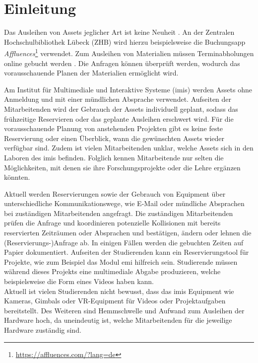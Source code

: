 
\chapter{Einleitung}
Das Ausleihen von Assets jeglicher Art ist keine Neuheit
\cite{soderholm2018borrowing}. An der Zentralen Hochschulbibliothek Lübeck (ZHB)
wird hierzu beispielsweise die Buchungsapp
\textit{Affluences}\footnote{\url{https://affluences.com/?lang=de}} verwendet.
Zum Ausleihen von Materialien müssen Terminabholungen online gebucht werden
\cite{zhb_offnung_nodate}. Die Anfragen können überprüft werden, wodurch das
vorausschauende Planen der Materialien ermöglicht wird.

Am Institut für Multimediale und Interaktive Systeme (\ac{imis}) werden Assets
ohne Anmeldung und mit einer mündlichen Absprache verwendet. Aufseiten der
Mitarbeitenden wird der Gebrauch der Assets individuell geplant, sodass das
frühzeitige Reservieren oder das geplante Ausleihen erschwert wird. Für die
vorausschauende Planung von anstehenden Projekten gibt es keine feste
Reservierung oder einen Überblick, wann die gewünschten Assets wieder verfügbar
sind. Zudem ist vielen Mitarbeitenden unklar, welche Assets sich in den Laboren
des \ac{imis} befinden. Folglich kennen Mitarbeitende nur selten die
Möglichkeiten, mit denen sie ihre Forschungsprojekte oder die Lehre ergänzen
könnten.

Aktuell werden Reservierungen sowie der Gebrauch von Equipment über
unterschiedliche Kommunikationswege, wie E-Mail oder mündliche Absprachen bei
zuständigen Mitarbeitenden angefragt. Die zuständigen Mitarbeitenden prüfen die
Anfrage und koordinieren potenzielle Kollisionen mit bereits reservierten
Zeiträumen oder Absprachen und bestätigen, ändern oder lehnen die
(Reservierungs-)Anfrage ab. In einigen Fällen werden die gebuchten Zeiten auf
Papier dokumentiert. Aufseiten der Studierenden kann ein Reservierungstool für
Projekte, wie zum Beispiel das Modul \ac{emi} hilfreich sein. Studierende
müssen während dieses Projekts eine multimediale Abgabe produzieren, welche
beispielsweise die Form eines Videos haben kann.\\ Aktuell ist vielen
Studierenden nicht bewusst, dass das \ac{imis} Equipment wie Kameras, Gimbals
oder VR-Equipment für Videos oder Projektaufgaben bereitstellt. Des Weiteren
sind Hemmschwelle und Aufwand zum Ausleihen der Hardware hoch, da uneindeutig
ist, welche Mitarbeitenden für die jeweilige Hardware zuständig sind.

